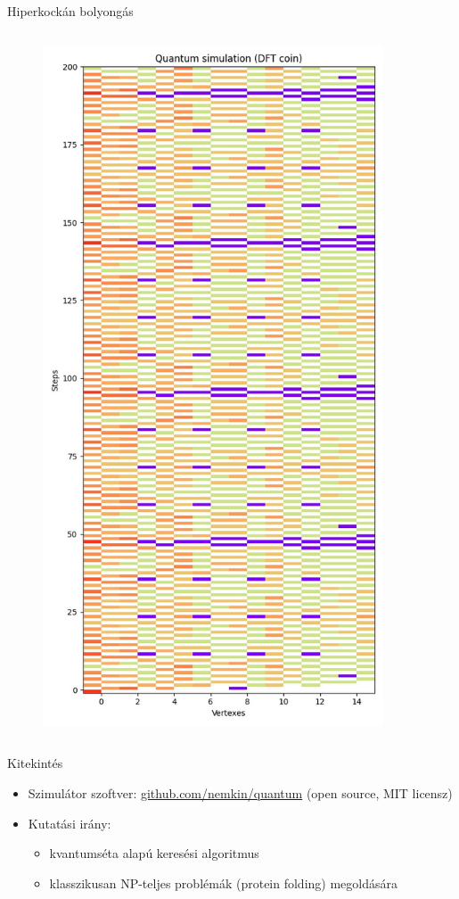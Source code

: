\documentclass[aspectratio=169]{beamer}
\begin{document}
\begin{frame}{Hiperkockán bolyongás}
\begin{columns}[onlytextwidth]
\begin{column}{.23\textwidth}
\begin{figure}
        \includegraphics[width=0.9\textwidth]{./tdk_figures/results/hypercube/dft.jpg}
      \end{figure}
    \end{column}
  \end{columns}
\end{frame}

\begin{frame}{Kitekintés}
\begin{itemize}
    \item Szimulátor szoftver: \url{github.com/nemkin/quantum} (open source, MIT licensz)
    \item Kutatási irány:
    \begin{itemize}
        \item kvantumséta alapú keresési algoritmus
        \item klasszikusan NP-teljes problémák (protein folding) megoldására
    \end{itemize}
\end{itemize}
\end{frame}
\end{document}
